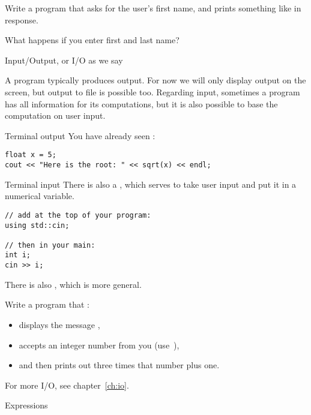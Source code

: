 \begin{exercise}
  \label{ex:ask-for-name}
  Write a program that asks for the user's first name, and prints
  something like  in response.

  What happens if you enter first and last name?
\end{exercise}

 {Input/Output, or I/O as we say}
\label{sec:io}

A program typically produces output. For now we will only display
output on the screen, but output to file is possible too.  Regarding
input, sometimes a program has all information for its computations,
but it is also possible to base the computation on user input.

\begin{block}{Terminal output}
  \label{sl:cout}
You have already seen :
\begin{verbatim}
float x = 5;
cout << "Here is the root: " << sqrt(x) << endl;
\end{verbatim}
\end{block}

\begin{block}{Terminal input}
  \label{sl:cin}
  There is also a , which serves to take user input and
  put it in a numerical variable.
\begin{verbatim}
// add at the top of your program:
using std::cin;

// then in your main:
int i;
cin >> i;
\end{verbatim}
There is also , which is more general.
\end{block}

\begin{exercise}
  \label{ex:cin-cout3np1}
  Write a program that :
  \begin{itemize}
  \item displays the message ,
  \item accepts an integer number from you (use~),
  \item and then prints out three times that number plus one.
  \end{itemize}
\end{exercise}

For more I/O, see chapter~\ref{ch:io}.

 {Expressions}
\label{sec:expr}

